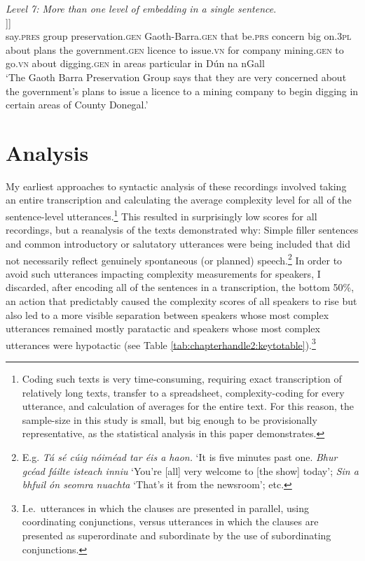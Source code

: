 \documentclass[output=paper,colorlinks,citecolor=brown]{langscibook}
\begin{document}
\ea\label{ex.level7}{\textit{Level 7: More than one level of embedding in a single sentence}.}\\
\gll [Deir grúpa caomhnaithe Ghaoth-Barra [go bhfuil imní mhór orthu faoi phleananna an rialtais [ceadúnas a eisiúint do chomhlacht mianadóireachta le [dhul {i mbun} tochailte i gceantair éagsúla i nDún na nGall.]]]\\
say.\textsc{pres} group preservation.\textsc{gen} Gaoth-Barra.\textsc{gen} that be.\textsc{prs} concern big on.\textsc{3pl} about plans the government.\textsc{gen} licence to issue.\textsc{vn} for company mining.\textsc{gen} to go.\textsc{vn} about digging.\textsc{gen} in areas particular in Dún na nGall\\
\glt ‘The Gaoth Barra Preservation Group says that they are very concerned about the government's plans to issue a licence to a mining company to begin digging in certain areas of County Donegal.’
\z


\section{Analysis}

My earliest approaches to syntactic analysis of these recordings involved taking an entire transcription and calculating the average complexity level for all of the sentence-level utterances.\footnote{Coding such texts is very time-consuming, requiring exact transcription of relatively long texts, transfer to a spreadsheet, complexity-coding for every utterance, and calculation of averages for the entire text. For this reason, the sample-size in this study is small, but big enough to be provisionally representative, as the statistical analysis in this paper demonstrates.} This resulted in surprisingly low scores for all recordings, but a reanalysis of the texts demonstrated why: Simple filler sentences and common introductory or salutatory utterances were being included that did not necessarily reflect genuinely spontaneous (or planned) speech.\footnote{E.g. \textit{Tá sé cúig nóiméad tar éis a haon.} `It is five minutes past one. \textit{Bhur gcéad fáilte isteach inniu} `You're [all] very welcome to [the show] today'; \textit{Sin a bhfuil ón seomra nuachta} `That's it from the newsroom'; etc.} In order to avoid such utterances impacting complexity measurements for speakers, I discarded, after encoding all of the sentences in a transcription, the bottom 50\%, an action that predictably caused the complexity scores of all speakers to rise but also led to a more visible separation between speakers whose most complex utterances remained mostly paratactic and speakers whose most complex utterances were hypotactic (see Table \ref{tab:chapterhandle2:keytotable}).\footnote{I.e.\ utterances in which the clauses are presented in parallel, using coordinating conjunctions, versus utterances in which the clauses are presented as superordinate and subordinate by the use of subordinating conjunctions.}
\end{document}
